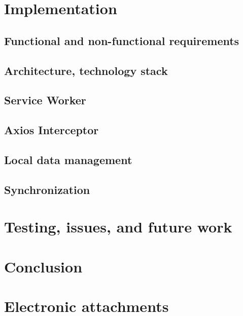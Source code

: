 \documentclass[
  digital,     %
  color,       %
  oneside,     %
  nosansbold,  %
  nocolorbold, %
  lof,         %
  lot,         %
]{fithesis4}
\begin{document}
\chapter{Implementation}
\section{Functional and non-functional requirements}
\section{Architecture, technology stack}
\section{Service Worker}
\section{Axios Interceptor}
\section{Local data management}
\section{Synchronization}

\chapter{Testing, issues, and future work}

\chapter*{Conclusion}

\setcounter{biburllcpenalty}{7000}
\setcounter{biburlucpenalty}{8000}
\printbibliography[heading=bibintoc] %

\appendix %
\chapter{Electronic attachments}
\end{document}
